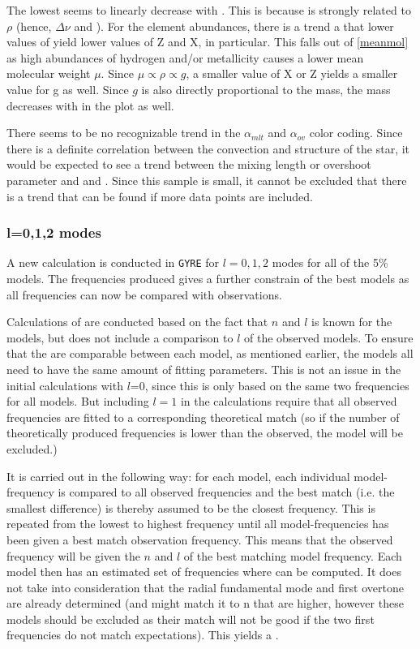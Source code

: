 The lowest \chis seems to linearly decrease with \teff. This is because \logg is strongly related to $\rho$ (hence, $\Delta \nu$ and \teff).  For the element abundances, there is a trend a that lower values of \logg yield lower values of Z and X, in particular. This falls out of \eqref{meanmol} as high abundances of hydrogen and/or metallicity causes a lower mean molecular weight $\mu$. Since $\mu \propto \rho \propto g$, a smaller value of X or Z yields a smaller value for g as well. Since $g$ is also directly proportional to the mass, the mass decreases with \logg in the plot as well. 

There seems to be no recognizable trend in the $\alpha_{mlt}$ and $\alpha_{ov}$ color coding. Since there is a definite correlation between the convection and structure of the star, it would be expected to see a trend between the mixing length or overshoot parameter and \logg and \teff. Since this sample is small, it cannot be excluded that there is a trend that can be found if more data points are included.   


\subsubsection{l=0,1,2 modes}
\label{highermodes}
A new calculation is conducted in \texttt{GYRE} for $l=0,1,2$ modes for all of the 5\% models. The frequencies produced gives a further constrain of the best models as all frequencies can now be compared with observations. 

Calculations of \chis are conducted based on the fact that $n$ and $l$ is known for the models, but does not include a comparison to $l$ of the observed models. To ensure that the \chis are comparable between each model, as mentioned earlier, the models all need to have the same amount of fitting parameters. This is not an issue in the initial \chis calculations with $l$=0, since this \chis is only based on the same two frequencies for all models. But including $l=1$ in the calculations require that all observed frequencies are fitted to a corresponding theoretical match (so if the number of theoretically produced frequencies is lower than the observed, the model will be excluded.)

It is carried out in the following way: for each model, each individual model-frequency is compared to all observed frequencies and the best match (i.e. the smallest difference) is thereby assumed to be the closest frequency. This is repeated from the lowest to highest frequency until all model-frequencies has been given a best match observation frequency. This means that the observed frequency will be given the $n$ and $l$ of the best matching model frequency. Each model then has an estimated set of frequencies where \chis can be computed. It does not take into consideration that the radial fundamental mode and first overtone are already determined (and might match it to n that are higher, however these models should be excluded as their match will not be good if the two first frequencies do not match expectations). This yields a \chis.


